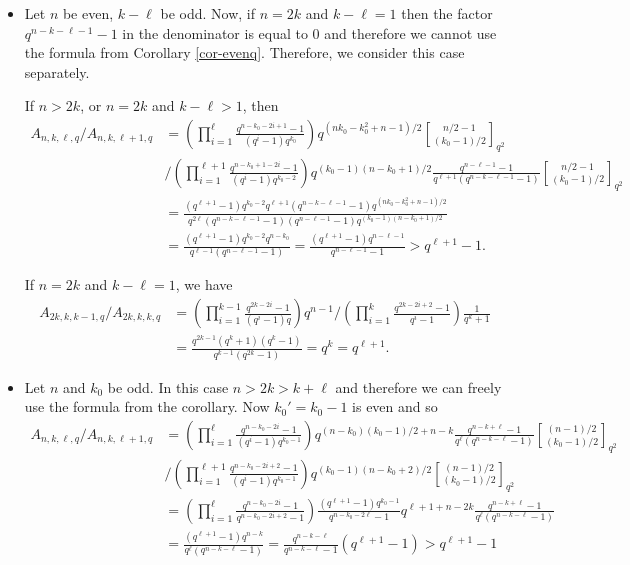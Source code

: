 \documentclass[a4paper,11pt]{article}
\begin{document}
\begin{itemize}
\item Let $n$ be even, $k-\ell$ be odd. Now, if $n=2k$ and $k-\ell=1$ then the factor $q^{n-k-\ell-1}-1$ in the denominator is equal to 0 and therefore we cannot use the formula from Corollary \ref{cor-evenq}. Therefore, we consider this case separately.

    If $n>2k$, or $n=2k$ and $k-\ell>1$, then
\begin{align*}
  A_{n,k,\ell,q}/A_{n,k,\ell+1,q} & =\left(\prod_{i=1}^\ell\frac{q^{n-k_0-2i+1}-1}{(q^i-1)q^{k_0}}\right)q^{(nk_0-k_0^2+n-1)/2}{n/2-1\brack(k_0-1)/2 }_{q^2}\\ &/\left(\prod_{i=1}^{\ell+1}\frac{q^{n-k_0+1-2i}-1}{(q^i-1)q^{k_0-2}}\right)q^{(k_0-1)(n-k_0+1)/2}\frac{q^{n-\ell-1}-1}{q^{\ell+1}(q^{n-k-\ell-1}-1)}{n/2-1\brack (k_0-1)/2 }_{q^2} \\
  & =\frac{(q^{\ell+1}-1)q^{k_0-2}q^{\ell+1}(q^{n-k-\ell-1}-1)q^{(nk_0-k_0^2+n-1)/2}}{q^{2\ell}(q^{n-k-\ell-1}
  -1)(q^{n-\ell-1}-1)q^{(k_0-1)(n-k_0+1)/2}}\\
  & =\frac{(q^{\ell+1}-1)q^{k_0-2}q^{n-k_0}}{q^{\ell-1}(q^{n-\ell-1}-1)}= \frac{(q^{\ell+1}-1)q^{n-\ell-1}}{q^{n-\ell-1}-1}>q^{\ell+1}-1.
\end{align*}

If $n=2k$ and $k-\ell=1$, we have
\begin{align*}
  A_{2k,k,k-1,q}/A_{2k,k,k,q} & =\left(\prod_{i=1}^{k-1}\frac{q^{2k-2i}-1}{(q^i-1)q}\right)q^{n-1} /\left(\prod_{i=1}^{k}\frac{q^{2k-2i+2}-1}{q^i-1}\right)\frac{1}{q^k+1} \\
  & =\frac{q^{2k-1}(q^k+1)(q^k-1)}{q^{k-1}(q^{2k}-1)}=q^k=q^{\ell+1}.
\end{align*}

\item Let $n$ and $k_0$ be odd. In this case $n>2k> k+\ell$ and therefore we can freely use the formula from the corollary. Now $k_0'=k_0-1$ is even and so %
\begin{align*}
  A_{n,k,\ell,q}/A_{n,k,\ell+1,q} & =\left(\prod_{i=1}^{\ell}\frac{q^{n-k_0-2i}-1}{(q^i-1)q^{k_0-1}}\right)q^{(n-k_0)(k_0-1)/2+n-k}\frac{q^{n-k+\ell}-1}{q^{\ell}(q^{n-k-\ell}-1)}{(n-1)/2\brack(k_0-1)/2 }_{q^2}\\ &/\left(\prod_{i=1}^{\ell+1}\frac{q^{n-k_0-2i+2}-1}{(q^i-1)q^{k_0-1}}\right)q^{(k_0-1)(n-k_0+2)/2}{(n-1)/2\brack (k_0-1)/2 }_{q^2} \\
  & = \left(\prod_{i=1}^{\ell}\frac{q^{n-k_0-2i}-1}{q^{n-k_0-2i+2}-1}\right)\frac{(q^{\ell+1}-1)q^{k_0-1}}{q^{n-k_0-2\ell}-1}q^{\ell+1+n-2k} \frac{q^{n-k+\ell}-1}{q^{\ell}(q^{n-k-\ell}-1)}\\
   & = \frac{(q^{\ell+1}-1)q^{n-k}}{q^{\ell}(q^{n-k-\ell}-1)} =\frac{q^{n-k-\ell}}{q^{n-k-\ell}-1}(q^{\ell+1}-1)>q^{\ell+1}-1
\end{align*}


\end{itemize}
\end{document}
